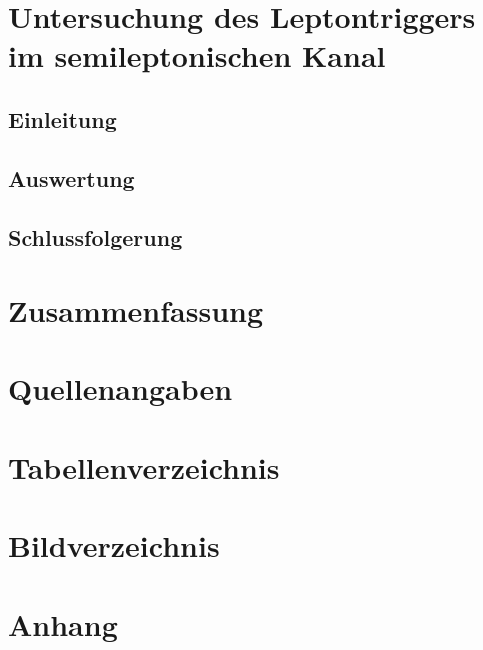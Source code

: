 \documentclass[12pt,a4paper]{article}
\begin{document}
\section{Untersuchung des Leptontriggers im semileptonischen Kanal}
\subsection{Einleitung}
\subsection{Auswertung}
\subsection{Schlussfolgerung}
\section{Zusammenfassung}
\section{Quellenangaben}
\section{Tabellenverzeichnis}
\section{Bildverzeichnis}
\section{Anhang}
\end{document}
